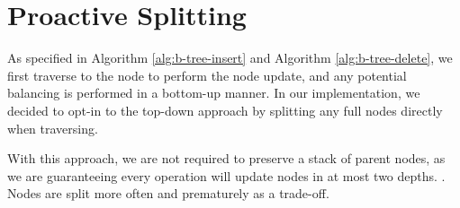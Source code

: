 \section{Proactive Splitting}

As specified in Algorithm \ref{alg:b-tree-insert} and Algorithm \ref{alg:b-tree-delete}, we first traverse to the node to perform the node update, and any potential balancing is performed in a bottom-up manner. In our implementation, we decided to opt-in to the top-down approach by splitting any full nodes directly when traversing.

With this approach, we are not required to preserve a stack of parent nodes, as we are guaranteeing every operation will update nodes in at most two depths. . Nodes are split more often and prematurely as a trade-off.